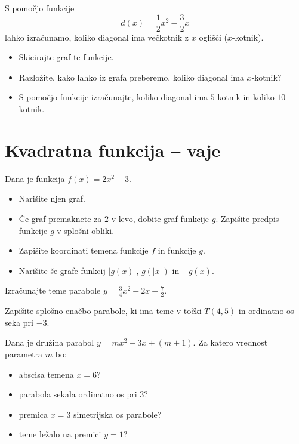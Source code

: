    \begin{naloga}
            S pomočjo funkcije $$ d(x)=\frac{1}{2}x^2-\frac{3}{2}x $$ lahko izračunamo,
            koliko diagonal ima večkotnik z $x$ oglišči ($x$-kotnik).

            \begin{itemize}
                \item Skicirajte graf te funkcije.
                \item Razložite, kako lahko iz grafa preberemo, koliko diagonal ima $x$-kotnik?
                \item S pomočjo funkcije izračunajte, koliko diagonal ima $5$-kotnik in koliko $10$-kotnik.
            \end{itemize}
                            
        \end{naloga}









\newpage
\section*{Kvadratna funkcija -- vaje}
\normalsize
\begin{naloga}
    Dana je funkcija $f(x)=2x^2-3$.
    \begin{itemize}
        \item Narišite njen graf.
        \item Če graf premaknete za $2$ v levo, dobite graf funkcije $g$. Zapišite predpis funkcije $g$ v splošni obliki.
        \item Zapišite koordinati temena funkcije $f$ in funkcije $g$.
        \item Narišite še grafe funkcij $|g(x)|$, $g(|x|)$ in $-g(x)$.
    \end{itemize}
\end{naloga}

\begin{naloga}
    Izračunajte teme parabole $y=\frac{3}{4}x^2-2x+\frac{7}{2}$.
\end{naloga}

\begin{naloga}
    Zapišite splošno enačbo parabole, ki ima teme v točki $T(4,5)$ in ordinatno os seka pri $-3$.
\end{naloga}

\begin{naloga}
    Dana je družina parabol $y=mx^2-3x+(m+1)$. Za katero vrednost parametra $m$ bo:
    \begin{itemize}
        \item abscisa temena $x=6$?
        \item parabola sekala ordinatno os pri $3$?
        \item premica $x=3$ simetrijska os parabole?
        \item teme ležalo na premici $y=1$?
    \end{itemize}
\end{naloga}

